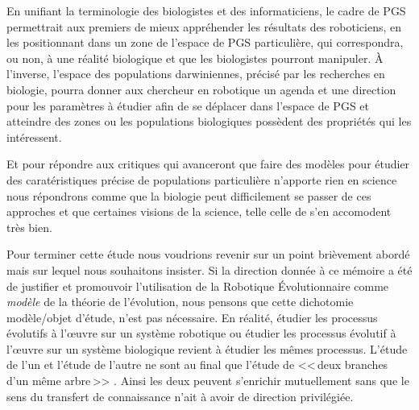 En unifiant la terminologie des biologistes et des informaticiens, le cadre de PGS permettrait aux premiers de mieux appréhender les résultats des roboticiens, en les positionnant dans un zone de l'espace de PGS particulière, qui correspondra, ou non, à une réalité biologique et que les biologistes pourront manipuler. \`A l'inverse, l'espace des populations darwiniennes, précisé par les recherches en biologie, pourra donner aux chercheur en robotique un agenda et une direction pour les paramètres à étudier afin de se déplacer dans l'espace de PGS et atteindre des zones ou les populations biologiques possèdent des propriétés qui les intéressent.

Et pour répondre aux critiques qui avanceront que faire des modèles pour étudier des caratéristiques précise de populations particulière n'apporte rien en science nous répondrons comme \cite{beatty1980ptimaldesignmodelsandstrategyofmodelbuildinginevolutionarybiology} que la biologie peut difficilement se passer de ces approches et que certaines visions de la science, telle celle de \cite{vanfraassen1972aformalapproachtothephilosophyofscience} s'en accomodent très bien.

Pour terminer cette étude nous voudrions revenir sur un point brièvement abordé mais sur lequel nous souhaitons insister. Si la direction donnée à ce mémoire a été de justifier et promouvoir l'utilisation de la Robotique \'Evolutionnaire comme \emph{modèle} de la théorie de l'évolution, nous pensons que cette dichotomie modèle/objet d'étude, n'est pas nécessaire. En réalité, étudier les processus évolutifs à l'\oe uvre sur un système robotique ou étudier les processus évolutif à l'\oe uvre sur un système biologique revient à étudier les mêmes processus. L'étude de l'un et l'étude de l'autre ne sont au final que l'étude de <<\,deux branches d'un même arbre\,>> \citep{huneman12computersciencemeetsevolutionarybiologypurepossibleprocessesissuegradualism}. Ainsi les deux peuvent s'enrichir mutuellement sans que le sens du transfert de connaissance n'ait à avoir de direction privilégiée.
